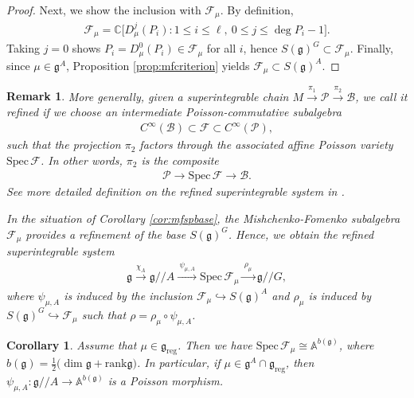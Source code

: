 \documentclass[11pt,reqno]{amsart}
\newtheorem*{theorem A}{Main Theorem A}
\newtheorem*{theorem B}{Main Theorem B}
\newtheorem*{theorem C}{Main Theorem C}
\newtheorem*{theorem D}{Main Theorem D}
\theoremstyle{definition}
\theoremstyle{plain}
\newtheorem{corollary}[theorem]{Corollary}
\newtheorem{remark}[theorem]{Remark}
\theoremstyle{conclusion}
\begin{document}
\begin{proof}
Next, we show the inclusion with $\mathcal{F}_\mu$. By definition, \begin{align*}
\mathcal{F}_\mu = \mathbb{C}\big[D_\mu^j(P_i) : 1\leq i\leq \ell,\ 0\leq j\leq \deg P_i-1\big].
\end{align*}  Taking $j=0$ shows $P_i=D_\mu^0(P_i)\in\mathcal{F}_\mu$ for all $i$, hence $S(\mathfrak{g})^G\subset\mathcal{F}_\mu$. Finally, since $\mu\in\mathfrak{g}^A$, Proposition \ref{prop:mfcriterion} yields $\mathcal{F}_\mu\subset S(\mathfrak{g})^A$.
\end{proof}

\begin{remark}
\label{rem:refinedsuperintegrable}
More generally, given a superintegrable chain $M\xrightarrow{\pi_1}\mathcal{P}\xrightarrow{\pi_2}\mathcal{B}$, we call it \emph{refined} if we choose an intermediate Poisson-commutative subalgebra \begin{align*}
    C^\infty(\mathcal{B})\subset \mathcal{F}\subset C^\infty(\mathcal{P}),
\end{align*}
such that the projection $\pi_2$ factors through the associated affine Poisson variety $\mathrm{Spec}\,\mathcal{F}$. In other words, $\pi_2$ is the composite \begin{align*}
     \mathcal{P}\longrightarrow \mathrm{Spec}\,\mathcal{F}\longrightarrow \mathcal{B}.
 \end{align*} See more detailed definition on the refined superintegrable  system in \cite{ArthamonovReshetikhin2021}.

In the situation of Corollary \ref{cor:mfspbase}, the Mishchenko-Fomenko subalgebra $\mathcal{F}_\mu$ provides a refinement of the base $S(\mathfrak{g})^G$. Hence, we obtain the \emph{refined superintegrable system} \begin{align*}
    \mathfrak{g}\xrightarrow{\chi_A}\mathfrak{g}//A \xrightarrow{\ \psi_{\mu,A}\ }\mathrm{Spec}\,\mathcal{F}_\mu \xrightarrow{\ \rho_{\mu}\ }\mathfrak{g}//G,
\end{align*} where $\psi_{\mu,A}$ is induced by the inclusion $\mathcal{F}_\mu\hookrightarrow S(\mathfrak{g})^A$ and $\rho_{\mu}$ is induced by $S(\mathfrak{g})^G\hookrightarrow \mathcal{F}_\mu$ such that $\rho = \rho_{\mu}\circ \psi_{\mu,A}$.
\end{remark}

\begin{corollary}
\label{cor:mfspectrum}
Assume that $\mu \in \mathfrak{g}_{\mathrm{reg}}$. Then we have $\mathrm{Spec}\,\mathcal{F}_\mu \cong \mathbb{A}^{b(\mathfrak{g})}$, where $b(\mathfrak{g}) = \frac{1}{2}\big(\dim \mathfrak{g} + \mathrm{rank}\mathfrak{g}\big)$. In particular, if $\mu \in \mathfrak{g}^A \cap \mathfrak{g}_{\mathrm{reg}}$, then $\psi_{\mu,A} : \mathfrak{g}//A \longrightarrow \mathbb{A}^{b(\mathfrak{g})}$ is a Poisson morphism.
\end{corollary}
\end{document}
